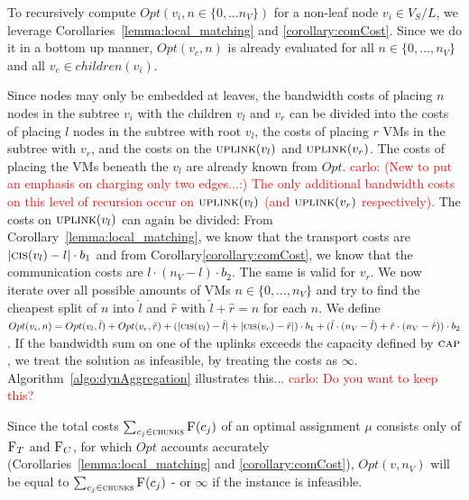 \documentclass[9pt,twocolumn]{scrartcl}
\newcommand{\Capacity}{\ensuremath{\textsc{cap}}}
\newcommand{\carlo}[1]{\textcolor{red}{carlo: #1}}
\newcommand{\VmChunkAssignment}{\mu}
\newcommand{\SubstrateNodes}{\ensuremath{V_S}}
\newcommand{\SubstrateNode}{\ensuremath{v}}
\newcommand{\Leaves}{\ensuremath{L}}
\newcommand{\Chunks}{\ensuremath{\textsc{chunks}}}
\newcommand{\Opt}{\ensuremath{Opt}}
\newcommand{\Children}{\ensuremath{children}}
\newcommand{\Uplink}{\ensuremath{\textsc{uplink}}}
\newcommand{\ChunkCount}{\ensuremath{\textsc{cis}}}
\newcommand{\achunk}{\ensuremath{c}}
\newcommand{\Cost}{\textsc{F}}
\newcommand{\CostTrans}{\ensuremath{b_1}}
\newcommand{\CostCom}{\ensuremath{b_2}}
\newcommand{\Vms}{\ensuremath{n_V}}
\begin{document}
\begin{appendix}
To recursively compute $\Opt(\SubstrateNode_i, n \in \{0,\dots\Vms\})$ for a
non-leaf node $\SubstrateNode_i \in \SubstrateNodes / \Leaves$, we leverage
Corollaries~\ref{lemma:local_matching} and \ref{corollary:comCost}. Since
we do it in a bottom up manner, $\Opt(\SubstrateNode_c, n)$
is already evaluated for all $n \in \{0,\dots,\Vms\}$ and all
$\SubstrateNode_c \in \Children(\SubstrateNode_i)$.

Since nodes may only be embedded at leaves, the bandwidth costs of placing $n$ nodes
in the subtree $\SubstrateNode_i$ with the children $\SubstrateNode_l$ and
$\SubstrateNode_r$ can be divided into the costs of placing $l$ nodes in the
subtree with root $\SubstrateNode_l$, the costs of placing
$r$ VMs in the subtree with $\SubstrateNode_r$, and the costs on the
$\Uplink(\SubstrateNode_l)$ and $\Uplink(\SubstrateNode_r)$. The costs of
placing the VMs beneath the $\SubstrateNode_l$ are already known from
$\Opt$. \carlo{(New to put an emphasis on charging only two edges...:) The only
additional bandwidth costs on this level of recursion occur on
$\Uplink(\SubstrateNode_l)$ (and $\Uplink(\SubstrateNode_r)$ respectively).}
The costs on $\Uplink(\SubstrateNode_l)$ can again be divided: From
Corollary~\ref{lemma:local_matching}, we know that the transport costs are
 $|\ChunkCount(\SubstrateNode_l) - l| \cdot \CostTrans$ and from
Corollary\ref{corollary:comCost}, we know that the communication costs are
$l\cdot (\Vms - l) \cdot \CostCom$. The same is valid for $\SubstrateNode_r$.
We now iterate over all possible amounts of VMs $n \in \{0,\dots,\Vms\}$ and
try to find the cheapest split of $n$ into $\hat l$ and $\hat r$ with
$\hat l + \hat r = n$ for each $n$. We define $\Opt(\SubstrateNode_i, n) =
\Opt(\SubstrateNode_{l}, \hat l) + \Opt(\SubstrateNode_{r}, \hat r) +
(|\ChunkCount(\SubstrateNode_{l}) - \hat
l|+|\ChunkCount(\SubstrateNode_{r}) - \hat r|) \cdot \CostTrans + (\hat
l\cdot (\Vms - \hat l) + \hat r\cdot (\Vms - \hat r)) \cdot \CostCom$. If the
bandwidth sum on one of the uplinks exceeds the capacity defined by
$\Capacity$, we treat the solution as infeasible, by treating the costs as
$\infty$. Algorithm~\ref{algo:dynAggregation} illustrates this... \carlo{Do you
want to keep this?}

Since the total costs $\sum_{\achunk_j \in
\Chunks}\Cost(\achunk_j)$ of an optimal assignment $\VmChunkAssignment$
consists only of $\Cost_T$ and $\Cost_C$, for which $\Opt$ accounts accurately
(Corollaries~\ref{lemma:local_matching} and \ref{corollary:comCost}),
$\Opt(\SubstrateNode, \Vms)$ will be equal to $\sum_{\achunk_j \in
\Chunks}\Cost(\achunk_j)$ - or $\infty$ if the instance is infeasible.


\end{appendix}
\end{document}
